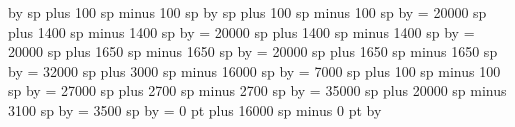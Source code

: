 {\multiply\punctuminclinatumdebilisshift by \grefactor %
%
 sp plus 100 sp minus 100 sp%
\multiply\punctuminclinatumbigshift by \grefactor%
%
 sp plus 100 sp minus 100 sp%
\multiply\punctuminclinatummaxshift by \grefactor%
%
\spacearoundsmallbar = 20000 sp plus 1400 sp minus 1400 sp%
\multiply\spacearoundsmallbar by \grefactor %
%
\spacearoundminor = 20000 sp plus 1400 sp minus 1400 sp%
\multiply\spacearoundminor by \grefactor %
%
\spacearoundmaior = 20000 sp plus 1650 sp minus 1650 sp%
\multiply\spacearoundmaior by \grefactor %
%
\spacearoundfinalis = 20000 sp plus 1650 sp minus 1650 sp%
\multiply\spacearoundfinalis by \grefactor %
%
\spacebeforefinalfinalis= 32000 sp plus 3000 sp minus 16000 sp%
\multiply\spacebeforefinalfinalis by \grefactor %
%
\spacearoundclefbars= 7000 sp plus 100 sp minus 100 sp%
\multiply\spacearoundclefbars by \grefactor %
%
\textbartextspace = 27000 sp plus 2700 sp minus 2700 sp%
\multiply\textbartextspace by \grefactor %
%
\notebarspace = 35000 sp plus 20000 sp minus 3100 sp%
\multiply\notebarspace by \grefactor %
%
\maximumspacewithoutdash = 3500 sp%
\multiply\maximumspacewithoutdash by \grefactor %
%
\afterclefnospace = 0 pt plus 16000 sp minus 0 pt%
\multiply\afterclefnospace by \grefactor %
\relax %
}
